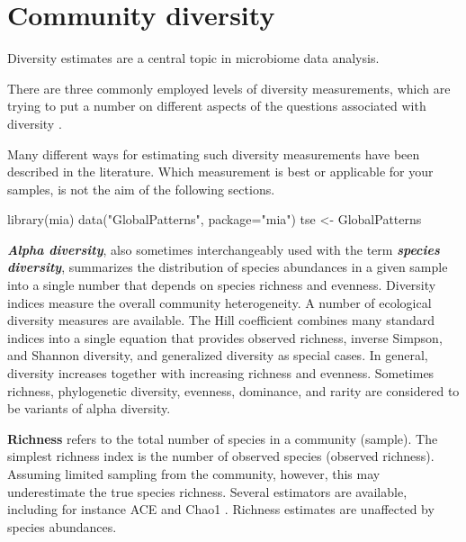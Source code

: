 \documentclass[
]{book}
\newenvironment{Shaded}{\begin{snugshade}}{\end{snugshade}}
\newcommand{\AttributeTok}[1]{\textcolor[rgb]{0.77,0.63,0.00}{#1}}
\newcommand{\FunctionTok}[1]{\textcolor[rgb]{0.00,0.00,0.00}{#1}}
\newcommand{\NormalTok}[1]{#1}
\newcommand{\OtherTok}[1]{\textcolor[rgb]{0.56,0.35,0.01}{#1}}
\newcommand{\StringTok}[1]{\textcolor[rgb]{0.31,0.60,0.02}{#1}}
\begin{document}
\hypertarget{community-diversity}{%
\chapter{Community diversity}\label{community-diversity}}

Diversity estimates are a central topic in microbiome data analysis.

There are three commonly employed levels of diversity measurements,
which are trying to put a number on different aspects of the questions
associated with diversity \citep{Whittaker1960}.

Many different ways for estimating such diversity measurements have been
described in the literature. Which measurement is best or applicable for your
samples, is not the aim of the following sections.

\begin{Shaded}
\begin{Highlighting}[]
\FunctionTok{library}\NormalTok{(mia)}
\FunctionTok{data}\NormalTok{(}\StringTok{"GlobalPatterns"}\NormalTok{, }\AttributeTok{package=}\StringTok{"mia"}\NormalTok{)}
\NormalTok{tse }\OtherTok{\textless{}{-}}\NormalTok{ GlobalPatterns}
\end{Highlighting}
\end{Shaded}

\textbf{\emph{Alpha diversity}}, also sometimes interchangeably used with the
term \textbf{\emph{species diversity}}, summarizes the distribution of species
abundances in a given sample into a single number that depends on
species richness and evenness. Diversity indices measure the overall
community heterogeneity. A number of ecological diversity measures are
available. The Hill coefficient combines many standard indices into a
single equation that provides observed richness, inverse Simpson, and
Shannon diversity, and generalized diversity as special cases. In
general, diversity increases together with increasing richness and
evenness. Sometimes richness, phylogenetic diversity, evenness, dominance,
and rarity are considered to be variants of alpha diversity.

\textbf{Richness} refers to the total number of species in a community
(sample). The simplest richness index is the number of observed
species (observed richness). Assuming limited sampling from the
community, however, this may underestimate the true species
richness. Several estimators are available, including for instance ACE
\citep{Chao1992} and Chao1 \citep{Chao1984}. Richness estimates are unaffected
by species abundances.
\end{document}
